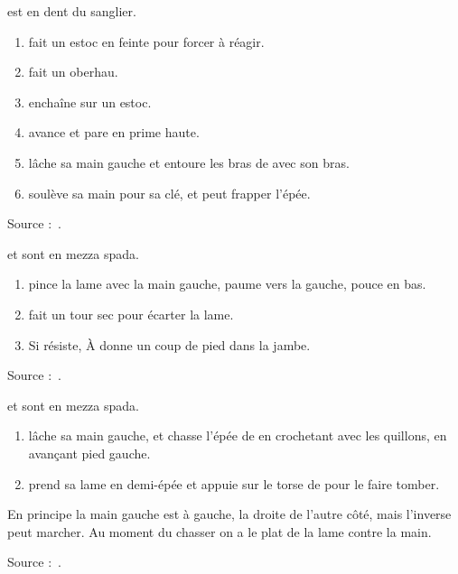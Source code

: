 \begin{technique}

\A est en dent du sanglier.

\begin{enumerate}
	\item \A fait un estoc en feinte pour forcer \D à réagir.
	\item \D fait un oberhau.
	\item \D enchaîne sur un estoc.
	\item \A avance et pare en prime haute.
	\item \A lâche sa main gauche et entoure les bras de \D avec son bras.
	\item \A soulève sa main pour sa clé, et peut frapper l'épée.
\end{enumerate}

Source :~\cite{petit:dijon:close_longword:2015}.

\end{technique}


\begin{technique}

\A et \D sont en mezza spada.

\begin{enumerate}
	\item \A pince la lame avec la main gauche, paume vers la gauche, pouce en bas.
	\item \A fait un tour sec pour écarter la lame.
	\item Si \D résiste, À donne un coup de pied dans la jambe.
\end{enumerate}

Source :~\cite{petit:dijon:close_longword:2015}.

\end{technique}


\begin{technique}

\A et \D sont en mezza spada.

\begin{enumerate}
	\item \A lâche sa main gauche, et chasse l'épée de \D en crochetant avec les quillons, en avançant pied gauche.
	\item \A prend sa lame en demi-épée et appuie sur le torse de \D pour le faire tomber.
\end{enumerate}

En principe la main gauche est à gauche, la droite de l'autre côté, mais l'inverse peut marcher.
Au moment du chasser on a le plat de la lame contre la main.

Source :~\cite{petit:dijon:close_longword:2015}.

\end{technique}


